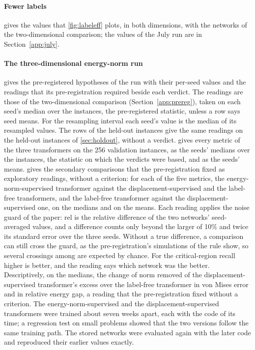 

\paragraph{Fewer labels}
 gives the values that \cref{fig:labeleff} plots, in both dimensions,
with the networks of the two-dimensional comparison; the values of the July run are in
Section~\ref{app:july}.



\paragraph{The three-dimensional energy-norm run}
 gives the pre-registered hypotheses of the run with their per-seed values and
the readings that its pre-registration required beside each verdict. The readings are those
of the two-dimensional comparison (Section~\ref{app:prereg}), taken on each seed's median
over the instances, the pre-registered statistic, unless a row says seed means. For the resampling interval each
seed's value is the median of its resampled values. The rows of the held-out instances give the same readings on the \numHoldThreeN{} held-out instances of
\cref{sec:holdout}, without a verdict. 
gives every metric of the three transformers on the 256 validation instances, as the seeds'
medians over the instances, the statistic on which the verdicts were based, and as the seeds' means.
 gives the \numKdSecondary{} secondary comparisons that the
pre-registration fixed as exploratory readings, without a criterion: for each of the five
metrics, the energy-norm-supervised transformer against the displacement-supervised and the
label-free transformers, and the label-free transformer against the displacement-supervised
one, on the medians and on the means. Each reading applies the noise guard of the paper: rel
is the relative difference of the two networks' seed-averaged values, and a difference
counts only beyond the larger of 10\% and twice its standard error over the three seeds.
Without a true difference, a comparison can still cross the guard, as the pre-registration's
simulations of the rule show, so several crossings among
\numKdSecondary{} are expected by chance. For the critical-region recall higher is better,
and the reading says which network was the better. Descriptively, on the medians, the change
of norm removed \numKdClosureVm{} of the displacement-supervised transformer's excess over
the label-free transformer in von Mises error and \numKdClosureGap{} in relative energy gap,
a reading that the pre-registration fixed without a criterion. The energy-norm-supervised
and the displacement-supervised transformers were trained about seven weeks apart, each with the code of its time; a regression test on small problems showed that the two
versions follow the same training path. The stored networks were evaluated again with the later code and reproduced their
earlier values exactly.


